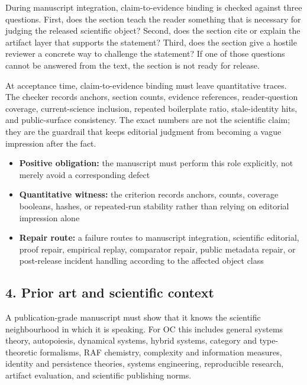 During manuscript integration, claim-to-evidence binding is checked against three questions. First, does the section teach the reader something that is necessary for judging the released scientific object? Second, does the section cite or explain the artifact layer that supports the statement? Third, does the section give a hostile reviewer a concrete way to challenge the statement? If one of those questions cannot be answered from the text, the section is not ready for release.


At acceptance time, claim-to-evidence binding must leave quantitative traces. The checker records anchors, section counts, evidence references, reader-question coverage, current-science inclusion, repeated boilerplate ratio, stale-identity hits, and public-surface consistency. The exact numbers are not the scientific claim; they are the guardrail that keeps editorial judgment from becoming a vague impression after the fact.


\begin{itemize}[leftmargin=1.8em]

\item \textbf{Positive obligation:} the manuscript must perform this role explicitly, not merely avoid a corresponding defect

\item \textbf{Quantitative witness:} the criterion records anchors, counts, coverage booleans, hashes, or repeated-run stability rather than relying on editorial impression alone

\item \textbf{Repair route:} a failure routes to manuscript integration, scientific editorial, proof repair, empirical replay, comparator repair, public metadata repair, or post-release incident handling according to the affected object class

\end{itemize}

\subsection{4. Prior art and scientific context}

A publication-grade manuscript must show that it knows the scientific neighbourhood in which it is speaking. For OC this includes general systems theory, autopoiesis, dynamical systems, hybrid systems, category and type-theoretic formalisms, RAF chemistry, complexity and information measures, identity and persistence theories, systems engineering, reproducible research, artifact evaluation, and scientific publishing norms.


